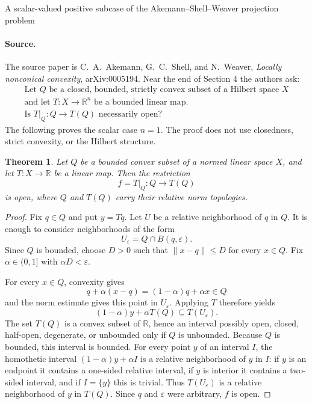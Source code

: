 \documentclass[11pt]{article}
\newtheorem{theorem}{Theorem}
\begin{document}
\begin{center}
{\Large A scalar-valued positive subcase of the Akemann--Shell--Weaver projection problem}
\end{center}

\paragraph{Source.}
The source paper is C.~A.~Akemann, G.~C.~Shell, and N.~Weaver,
\emph{Locally nonconical convexity}, arXiv:0005194.  Near the end of
Section 4 the authors ask:
\[
\begin{gathered}
\text{Let } Q \text{ be a closed, bounded, strictly convex subset of a Hilbert space } X\\
\text{and let } T:X\to\mathbb R^n \text{ be a bounded linear map.}\\
\text{Is } T|_Q:Q\to T(Q) \text{ necessarily open?}
\end{gathered}
\]
The following proves the scalar case \(n=1\).  The proof does not use
closedness, strict convexity, or the Hilbert structure.

\begin{theorem}
Let \(Q\) be a bounded convex subset of a normed linear space \(X\), and let
\(T:X\to\mathbb R\) be a linear map.  Then the restriction
\[
        f=T|_Q:Q\longrightarrow T(Q)
\]
is open, where \(Q\) and \(T(Q)\) carry their relative norm topologies.
\end{theorem}

\begin{proof}
Fix \(q\in Q\) and put \(y=Tq\).  Let \(U\) be a relative neighborhood of
\(q\) in \(Q\).  It is enough to consider neighborhoods of the form
\[
        U_\varepsilon=Q\cap B(q,\varepsilon).
\]
Since \(Q\) is bounded, choose \(D>0\) such that
\(\|x-q\|\le D\) for every \(x\in Q\).  Fix
\(\alpha\in(0,1]\) with \(\alpha D<\varepsilon\).

For every \(x\in Q\), convexity gives
\[
        q+\alpha(x-q)=(1-\alpha)q+\alpha x\in Q
\]
and the norm estimate gives this point in \(U_\varepsilon\).  Applying \(T\)
therefore yields
\[
        (1-\alpha)y+\alpha T(Q)\subseteq T(U_\varepsilon).
\]
The set \(T(Q)\) is a convex subset of \(\mathbb R\), hence an interval
possibly open, closed, half-open, degenerate, or unbounded only if \(Q\) is
unbounded.  Because \(Q\) is bounded, this interval is bounded.  For every
point \(y\) of an interval \(I\), the homothetic interval
\((1-\alpha)y+\alpha I\) is a relative neighborhood of \(y\) in \(I\):
if \(y\) is an endpoint it contains a one-sided relative interval, if \(y\)
is interior it contains a two-sided interval, and if \(I=\{y\}\) this is
trivial.  Thus \(T(U_\varepsilon)\) is a relative neighborhood of \(y\) in
\(T(Q)\).  Since \(q\) and \(\varepsilon\) were arbitrary, \(f\) is open.
\end{proof}
\end{document}

